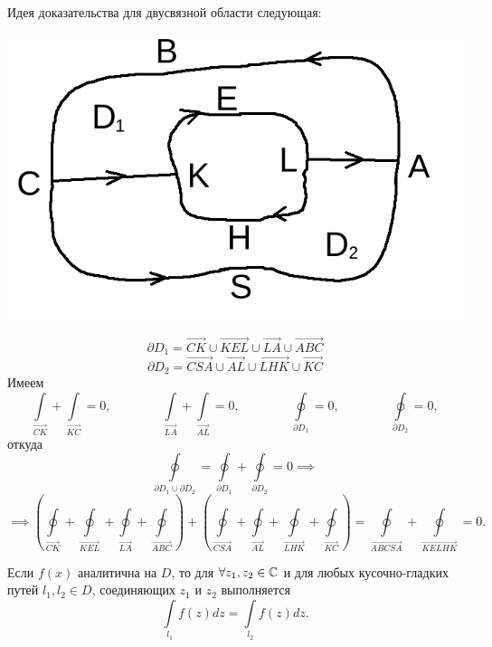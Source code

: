 \documentclass[../../main.tex]{subfiles}
\begin{document}
Идея доказательства для двусвязной области следующая:
\begin{center}
\includegraphics[scale = 0.3]{lec31_2.png}
\end{center}
\[ \partial D_1 = \overrightarrow{CK} \cup \overrightarrow{KEL}
\cup \overrightarrow{LA} \cup \overrightarrow{ABC} \]
\[ \partial D_2 = \overrightarrow{CSA} \cup \overrightarrow{AL} \cup
\overrightarrow{LHK} \cup \overrightarrow{KC} \]
Имеем
\[ \int\limits_{\overrightarrow{CK}} +
\int\limits_{\overrightarrow{KC}} = 0, \qquad\qquad
\int\limits_{\overrightarrow{LA}} +
\int\limits_{\overrightarrow{AL}} = 0, \qquad\qquad
\oint\limits_{\partial D_1} = 0, \qquad\qquad
\oint\limits_{\partial D_2} = 0, \]
откуда
\[ \oint\limits_{\partial D_1 \cup \partial D_2} = 
\oint\limits_{\partial D_1} + \oint\limits_{\partial D_2} = 0 \implies\]
\[\implies
\left( \oint\limits_{\overrightarrow{CK}} + 
\oint\limits_{\overrightarrow{KEL}} +
\oint\limits_{\overrightarrow{LA}} +
\oint\limits_{\overrightarrow{ABC}} \right) + \left(
\oint\limits_{\overrightarrow{CSA}} +
\oint\limits_{\overrightarrow{AL}} +
\oint\limits_{\overrightarrow{LHK}} +
\oint\limits_{\overrightarrow{KC}} \right)
= \oint\limits_{\overrightarrow{ABCSA}} +
\oint\limits_{\overrightarrow{KELHK}} = 0. \]
\begin{crl*}
	Если $f(x)$ аналитична на $D$, то для $ \forall z_1, z_2 \in \mathbb{C} $
	и для любых кусочно-гладких путей $ l_1, l_2 \in D$, соединяющих
	$ z_1 $ и $ z_2 $ выполняется
	\[ \int\limits_{l_1} f(z) dz =
	\int\limits_{l_2} f(z) dz. \]
\end{crl*}
\end{document}
